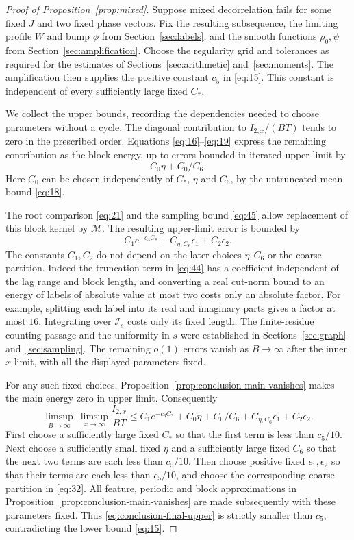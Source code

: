 \begin{proof}[Proof of Proposition~\ref{prop:mixed}]
Suppose mixed decorrelation fails for some fixed $J$ and two fixed
phase vectors.  Fix the resulting subsequence, the limiting profile $W$ and bump $\phi$
from Section~\ref{sec:labels}, and the smooth functions $\rho_0,\psi$
from Section~\ref{sec:amplification}.  Choose the regularity grid and
tolerances as required for the estimates of
Sections~\ref{sec:arithmetic} and~\ref{sec:moments}.  The amplification
then supplies the positive constant $c_5$ in \eqref{eq:15}.  This
constant is independent of every sufficiently large fixed $C_*$.

We collect the upper bounds, recording the dependencies needed to
choose parameters without a cycle.  The diagonal contribution to
$I_{2,x}/(BT)$ tends to zero in the prescribed order.  Equations
\eqref{eq:16}--\eqref{eq:19} express the remaining contribution as
the block energy, up to errors bounded in iterated upper limit by
\[
 C_0\eta+C_0/C_6.
\]
Here $C_0$ can be chosen independently of $C_*$, $\eta$ and $C_6$,
by the untruncated mean bound \eqref{eq:18}.

The root comparison \eqref{eq:21} and the sampling bound
\eqref{eq:45} allow replacement of this block kernel by
$\mathcal M$.  The resulting upper-limit error is bounded by
\[
 C_1 e^{-c_3C_*}+C_{\eta,C_6}\epsilon_1+C_2\epsilon_2.
\]
The constants $C_1,C_2$ do not depend on the later choices
$\eta,C_6$ or the coarse partition.  Indeed the truncation term in
\eqref{eq:44} has a coefficient independent of the lag range and
block length, and converting a real cut-norm bound to an energy of
labels of absolute value at most two costs only an absolute factor.
For example, splitting each label into its real and imaginary parts
gives a factor at most $16$.  Integrating over $\mathcal I_s$ costs
only its fixed length.  The finite-residue counting passage and the
uniformity in $s$ were established in Sections~\ref{sec:graph}
and~\ref{sec:sampling}.  The remaining $o(1)$ errors vanish as
$B\to\infty$ after the inner $x$-limit, with all the displayed
parameters fixed.

For any such fixed choices, Proposition~\ref{prop:conclusion-main-vanishes}
makes the main energy zero in upper limit.  Consequently
\begin{equation}
 \limsup_{B\to\infty}\ \limsup_{x\to\infty}
       \frac{I_{2,x}}{BT}
 \le C_1e^{-c_3C_*}
      +C_0\eta+C_0/C_6
      +C_{\eta,C_6}\epsilon_1+C_2\epsilon_2.
 \label{eq:conclusion-final-upper}
\end{equation}
First choose a sufficiently large fixed $C_*$ so that the first term
is less than $c_5/10$.  Next choose a sufficiently small fixed $\eta$
and a sufficiently large fixed $C_6$ so that the next two terms are
each less than $c_5/10$.  Then choose positive fixed
$\epsilon_1,\epsilon_2$ so that their terms are each less than
$c_5/10$, and choose the corresponding coarse partition in
\eqref{eq:32}.  All feature, periodic and block approximations in
Proposition~\ref{prop:conclusion-main-vanishes} are made subsequently
with these parameters fixed.  Thus \eqref{eq:conclusion-final-upper}
is strictly smaller than $c_5$, contradicting the lower bound
\eqref{eq:15}.


\end{proof}
